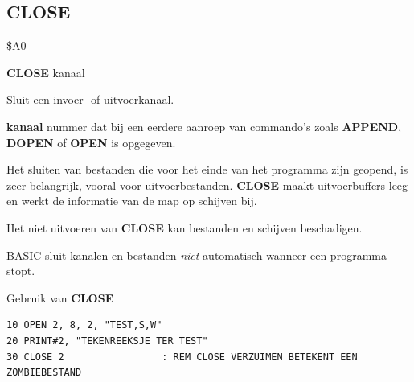 \subsection{CLOSE}
\begin{description}[leftmargin=2cm,style=nextline]
\item [Token:]   \$A0

\item [Formaat:]  {\bf CLOSE} kanaal

\item [Gebruik:]   Sluit een invoer- of uitvoerkanaal.

                 {\bf kanaal} nummer dat bij een eerdere aanroep van commando's zoals {\bf APPEND}, {\bf DOPEN} of {\bf OPEN} is opgegeven.

\item [Opmerkingen:] Het sluiten van bestanden die voor het einde van het programma zijn geopend, is zeer belangrijk, vooral voor uitvoerbestanden. {\bf CLOSE} maakt uitvoerbuffers leeg en werkt de informatie van de map op schijven bij.

                 Het niet uitvoeren van {\bf CLOSE} kan bestanden en schijven beschadigen.

                 BASIC sluit kanalen en bestanden {\em niet} automatisch wanneer een programma stopt.

\item [Voorbeeld:] Gebruik van {\bf CLOSE}

\begin{tcolorbox}[colback=black,coltext=white]
\verbatimfont{\codefont}
\begin{verbatim}
10 OPEN 2, 8, 2, "TEST,S,W"
20 PRINT#2, "TEKENREEKSJE TER TEST"
30 CLOSE 2                 : REM CLOSE VERZUIMEN BETEKENT EEN ZOMBIEBESTAND
\end{verbatim}
\end{tcolorbox}
\end{description}


\newpage

